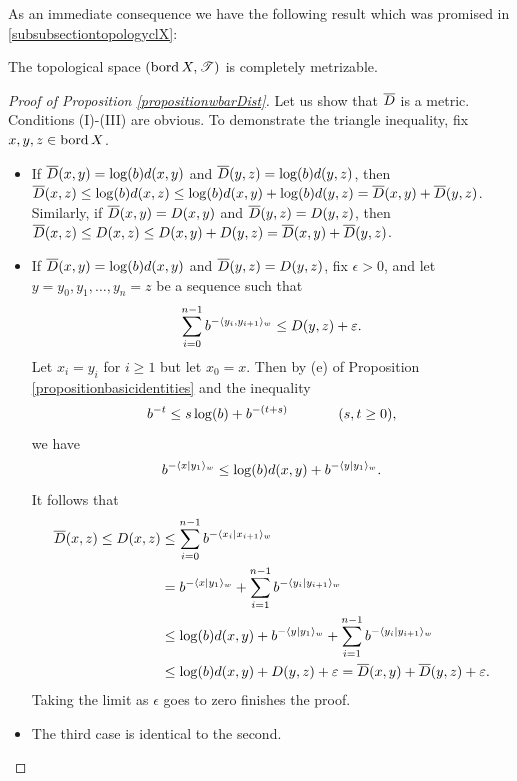 As an immediate consequence we have the following result which was promised in \6\ref{subsubsectiontopologyclX}:
\begin{corollary}
The topological space $(\operatorname{bord} X,\mathscr T)$ is completely metrizable.
\end{corollary}
\begin{proof}[Proof of Proposition \ref{propositionwbarDist}]
Let us show that $\overline{D}$ is a metric. Conditions (I)-(III) are obvious. To demonstrate the triangle inequality, fix $x,y,z\in\operatorname{bord} X$.
\begin{itemize}
\item[(1)] If $\overline{D}(x,y) = \log(b)d(x,y)$ and $\overline{D}(y,z) = \log(b)d(y,z)$, then $\overline{D}(x,z) \leq \log(b)d(x,z) \leq \log(b)d(x,y) + \log(b)d(y,z) = \overline{D}(x,y) + \overline{D}(y,z)$. Similarly, if $\overline{D}(x,y) = D(x,y)$ and $\overline{D}(y,z) = D(y,z)$, then $\overline{D}(x,z) \leq D(x,z) \leq D(x,y) + D(y,z) = \overline{D}(x,y) + \overline{D}(y,z)$.
\item[(2)] If $\overline{D}(x,y) = \log(b)d(x,y)$ and $\overline{D}(y,z) = D(y,z)$, fix $\epsilon > 0$, and let $y = y_0,y_1,\ldots,y_n = z$ be a sequence such that
\[
\sum_{i = 0}^{n - 1}b^{-\langle y_i,y_{i + 1}\rangle_w} \leq D(y,z) + \varepsilon.
\]
Let $x_i = y_i$ for $i\geq 1$ but let $x_0 = x$. Then by (e) of Proposition \ref{propositionbasicidentities} and the inequality
\[
b^{-t} \leq s\log(b) + b^{-(t + s)} \hspace{.5 in} (s,t \geq 0),
\]
we have
\[
b^{-\langle x|y_1\rangle_w} \leq \log(b)d(x,y) + b^{-\langle y|y_1\rangle_w}.
\]
It follows that
\begin{align*}
\overline{D}(x,z) \leq D(x,z) &\leq \sum_{i = 0}^{n - 1} b^{-\langle x_i|x_{i + 1}\rangle_w}\\
&= b^{-\langle x|y_1\rangle_w} + \sum_{i = 1}^{n - 1} b^{-\langle y_i|y_{i + 1}\rangle_w}\\
&\leq \log(b)d(x,y) + b^{-\langle y|y_1\rangle_w} + \sum_{i = 1}^{n - 1} b^{-\langle y_i|y_{i + 1}\rangle_w}\\
&\leq \log(b)d(x,y) + D(y,z) + \varepsilon = \overline{D}(x,y) + \overline{D}(y,z) + \varepsilon.
\end{align*}
Taking the limit as $\epsilon$ goes to zero finishes the proof.

\item[(3)] The third case is identical to the second.
\end{itemize}


\end{proof}
